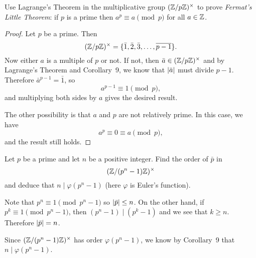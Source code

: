  Use Lagrange's Theorem in the multiplicative group
$(\mathbb{Z}/p\mathbb{Z})^\times$ to prove {\em Fermat's Little Theorem}: if $p$ is a
prime then $a^p\equiv a\pmod{p}$ for all $a\in\mathbb{Z}$.
\begin{proof}
  Let $p$ be a prime. Then
  \begin{equation*}
    (\mathbb{Z}/p\mathbb{Z})^\times = \{\bar1,\bar2,\bar3,\dots,\overline{p-1}\}.
  \end{equation*}
  Now either $a$ is a multiple of $p$ or not. If not, then
  $\bar{a}\in(\mathbb{Z}/p\mathbb{Z})^\times$ and by Lagrange's Theorem and
  Corollary~9, we know that $\lvert{\bar{a}}\rvert$ must divide
  $p-1$. Therefore $\bar{a}^{p-1} = \bar1$, so
  \begin{equation*}
    a^{p-1}\equiv 1\pmod{p},
  \end{equation*}
  and multiplying both sides by $a$ gives the desired result.

  The other possibility is that $a$ and $p$ are not relatively
  prime. In this case, we have
  \begin{equation*}
    a^p\equiv0\equiv a\pmod{p},
  \end{equation*}
  and the result still holds.
\end{proof}

 Let $p$ be a prime and let $n$ be a positive
integer. Find the order of $\bar{p}$ in
\begin{equation*}
  (\mathbb{Z}/(p^n-1)\mathbb{Z})^\times
\end{equation*}
and deduce that $n\mid\varphi(p^n-1)$ (here $\varphi$ is Euler's
function).
\begin{solution}
  Note that $p^n\equiv1\pmod{p^n-1}$ so $\lvert{\bar p}\rvert\leq n$. On the
  other hand, if $p^k\equiv1\pmod{p^n-1}$, then $(p^n-1)\mid(p^k-1)$
  and we see that $k\geq n$. Therefore $\lvert{\bar p}\rvert = n$.

  Since $(\mathbb{Z}/(p^n-1)\mathbb{Z})^\times$ has order $\varphi(p^n - 1)$, we know
  by Corollary~9 that $n\mid\varphi(p^n-1)$.
\end{solution}

